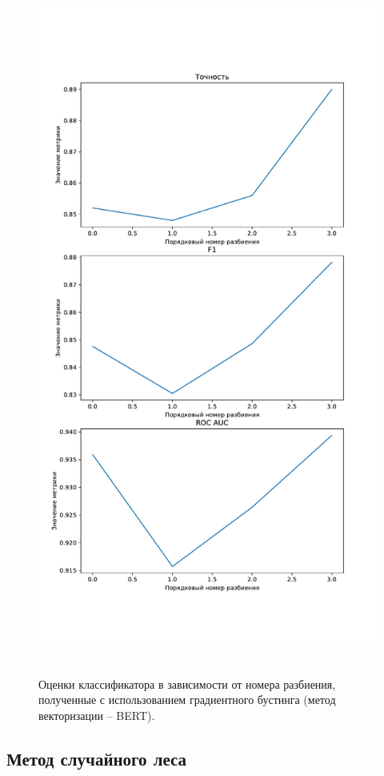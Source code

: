 \begin{figure}[H]
	\centering
	\includegraphics[height=23cm]{inc/plots/gradientMetricsBert.pdf}
	\caption{ Оценки классификатора в зависимости от номера разбиения, полученные с использованием градиентного бустинга (метод векторизации -- BERT). }
	\label{img:gradientMetricsBert}
\end{figure}



\subsection{Метод случайного леса }

